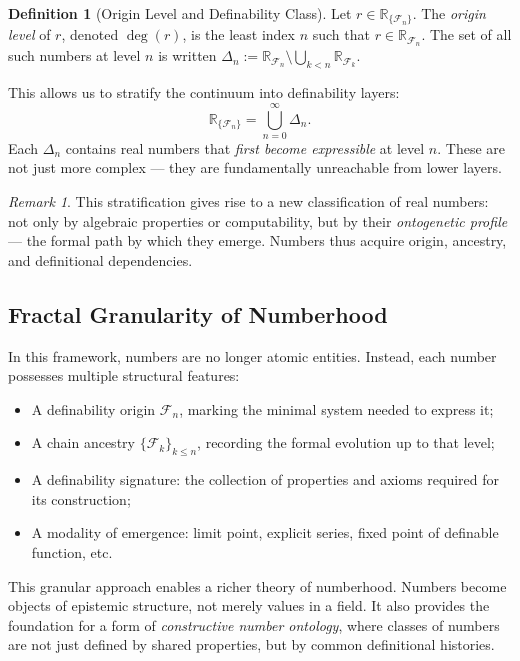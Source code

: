 \documentclass[12pt]{article}
\theoremstyle{definition}
\newtheorem{definition}{Definition}[section]
\theoremstyle{plain}
\theoremstyle{remark}
\newtheorem*{remark}{Remark}
\begin{document}
\begin{definition}[Origin Level and Definability Class]
Let \( r \in \mathbb{R}_{\{\mathcal{F}_n\}} \). The \emph{origin level} of \( r \), denoted \( \deg(r) \), is the least index \( n \) such that \( r \in \mathbb{R}_{\mathcal{F}_n} \). The set of all such numbers at level \( n \) is written \( \Delta_n := \mathbb{R}_{\mathcal{F}_n} \setminus \bigcup_{k < n} \mathbb{R}_{\mathcal{F}_k} \).
\end{definition}

This allows us to stratify the continuum into definability layers:
\[
    \mathbb{R}_{\{\mathcal{F}_n\}} = \bigcup_{n=0}^\infty \Delta_n.
\]
Each \( \Delta_n \) contains real numbers that \emph{first become expressible} at level \( n \). These are not just more complex — they are fundamentally unreachable from lower layers. 

\begin{remark}
This stratification gives rise to a new classification of real numbers: not only by algebraic properties or computability, but by their \emph{ontogenetic profile} — the formal path by which they emerge. Numbers thus acquire origin, ancestry, and definitional dependencies.
\end{remark}

\subsection*{Fractal Granularity of Numberhood}

In this framework, numbers are no longer atomic entities. Instead, each number possesses multiple structural features:
\begin{itemize}
    \item A definability origin \( \mathcal{F}_n \), marking the minimal system needed to express it;
    \item A chain ancestry \( \{ \mathcal{F}_k \}_{k \leq n} \), recording the formal evolution up to that level;
    \item A definability signature: the collection of properties and axioms required for its construction;
    \item A modality of emergence: limit point, explicit series, fixed point of definable function, etc.
\end{itemize}

This granular approach enables a richer theory of numberhood. Numbers become objects of epistemic structure, not merely values in a field. It also provides the foundation for a form of \emph{constructive number ontology}, where classes of numbers are not just defined by shared properties, but by common definitional histories.
\end{document}
